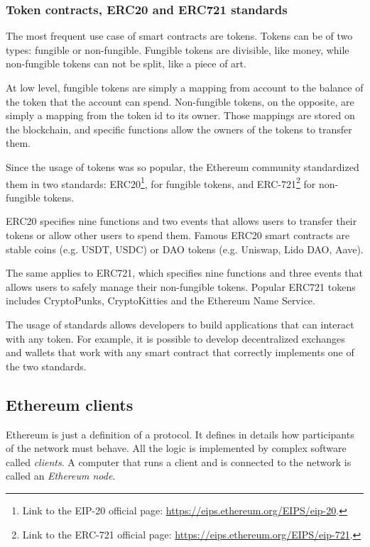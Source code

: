 \subsubsection{Token contracts, ERC20 and ERC721 standards}

The most frequent use case of smart contracts are tokens. Tokens can be of two types: fungible or non-fungible. Fungible tokens are divisible, like money, while non-fungible tokens can not be split, like a piece of art. 

At low level, fungible tokens are simply a mapping from account to the balance of the token that the account can spend. Non-fungible tokens, on the opposite, are simply a mapping from the token id to its owner. Those mappings are stored on the blockchain, and specific functions allow the owners of the tokens to transfer them.

Since the usage of tokens was so popular, the Ethereum community standardized them in two standards: ERC20\footnote{Link to the EIP-20 official page: \url{https://eips.ethereum.org/EIPS/eip-20}.}, for fungible tokens, and ERC-721\footnote{Link to the ERC-721 official page: \url{https://eips.ethereum.org/EIPS/eip-721}.} for non-fungible tokens. 

ERC20 specifies nine functions and two events that allows users to transfer their tokens or allow other users to spend them. Famous ERC20 smart contracts are stable coins (e.g. USDT, USDC) or DAO tokens (e.g. Uniswap, Lido DAO, Aave).

The same applies to ERC721, which specifies nine functions and three events that allows users to safely manage their non-fungible tokens. Popular ERC721 tokens includes CryptoPunks, CryptoKitties and the Ethereum Name Service.

The usage of standards allows developers to build applications that can interact with any token. For example, it is possible to develop decentralized exchanges and wallets that work with any smart contract that correctly implements one of the two standards.


\subsection{Ethereum clients}

Ethereum is just a definition of a protocol. It defines in details how participants of the network must behave. All the logic is implemented by complex software called \textit{clients}. A computer that runs a client and is connected to the network is called an \textit{Ethereum node}.


